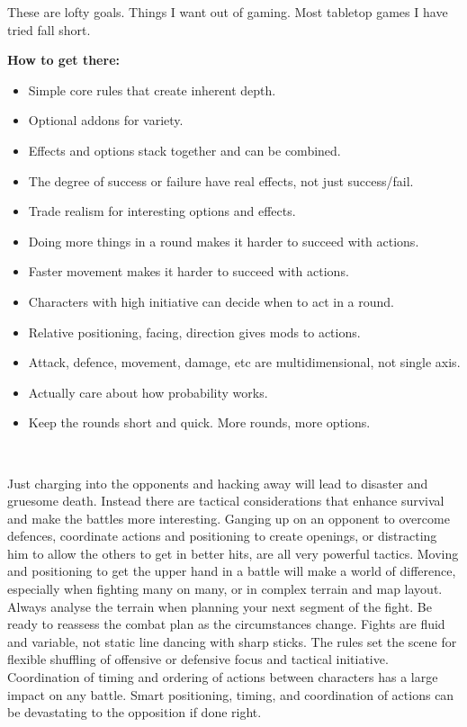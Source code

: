 These are lofty goals. Things I want out of gaming. Most tabletop games I have tried fall short.


\clearpage
\textbf{How to get there:}
\begin{itemize}
    \item Simple core rules that create inherent depth.
    \item Optional addons for variety.
    \item Effects and options stack together and can be combined.
    \item The degree of success or failure have real effects, not just success/fail.
    \item Trade realism for interesting options and effects.
    \item Doing more things in a round makes it harder to succeed with actions.
    \item Faster movement makes it harder to succeed with actions.
    \item Characters with high initiative can decide when to act in a round.
    \item Relative positioning, facing, direction gives mods to actions.
    \item Attack, defence, movement, damage, etc are multidimensional, not single axis.
    \item Actually care about how probability works.
    \item Keep the rounds short and quick. More rounds, more options.
\end{itemize}

\

Just charging into the opponents and hacking away will lead to disaster and gruesome death. Instead there are tactical considerations that enhance survival and make the battles more interesting. Ganging up on an opponent to overcome defences, coordinate actions and positioning to create openings, or distracting him to allow the others to get in better hits, are all very powerful tactics. Moving and positioning to get the upper hand in a battle will make a world of difference, especially when fighting many on many, or in complex terrain and map layout. Always analyse the terrain when planning your next segment of the fight. Be ready to reassess the combat plan as the circumstances change. Fights are fluid and variable, not static line dancing with sharp sticks. The rules set the scene for flexible shuffling of offensive or defensive focus and tactical initiative. Coordination of timing and ordering of actions between characters has a large impact on any battle. Smart positioning, timing, and coordination of actions can be devastating to the opposition if done right.

